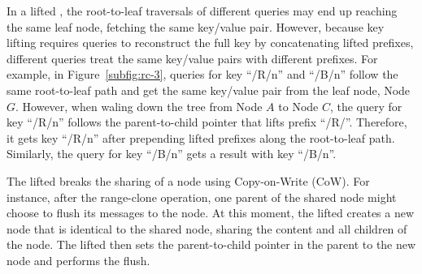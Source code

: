 In a lifted \bedag, the root-to-leaf traversals of different queries may end up
reaching the same leaf node, fetching the same key/value pair.
However, because key lifting requires queries to reconstruct the full key by
concatenating lifted prefixes, different queries treat the same key/value pairs
with different prefixes.
For example, in Figure~\ref{subfig:rc-3}, queries for key ``/R/n'' and ``/B/n''
follow the same root-to-leaf path and get the same key/value pair from the
leaf node, Node $G$.
However, when waling down the tree from Node $A$ to Node $C$, the query for
key ``/R/n'' follows the parent-to-child pointer that lifts prefix ``/R/''.
Therefore, it gets key ``/R/n'' after prepending lifted prefixes along the
root-to-leaf path.
Similarly, the query for key ``/B/n'' gets a result with key ``/B/n''.

The lifted \bedag breaks the sharing of a node using Copy-on-Write (CoW).
For instance, after the range-clone operation, one parent of the shared node
might choose to flush its messages to the node.
At this moment, the lifted \bedag creates a new node that is identical to the
shared node, sharing the content and all children of the node.
The lifted \bedag then sets the parent-to-child pointer in the parent to the new
node and performs the flush.

